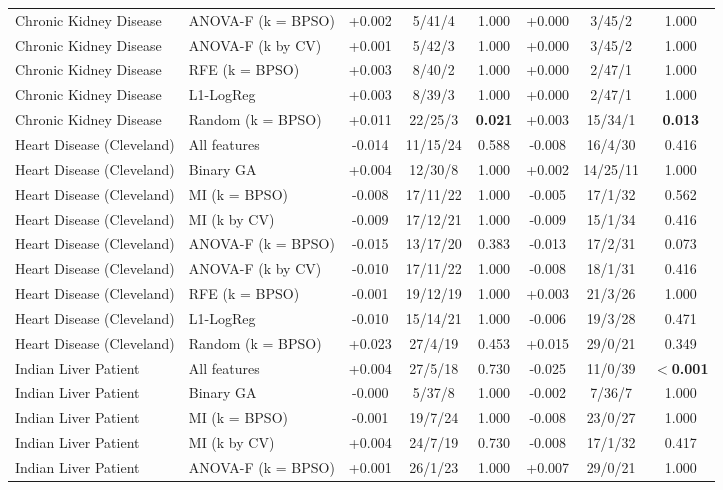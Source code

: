 \begin{table}[!t]
\begin{adjustbox}{max width=\linewidth}
\begin{tabular}{llcccccc}
Chronic Kidney Disease & ANOVA-F (k = BPSO) & +0.002 & 5/41/4 & 1.000 & +0.000 & 3/45/2 & 1.000 \\
Chronic Kidney Disease & ANOVA-F (k by CV) & +0.001 & 5/42/3 & 1.000 & +0.000 & 3/45/2 & 1.000 \\
Chronic Kidney Disease & RFE (k = BPSO) & +0.003 & 8/40/2 & 1.000 & +0.000 & 2/47/1 & 1.000 \\
Chronic Kidney Disease & L1-LogReg & +0.003 & 8/39/3 & 1.000 & +0.000 & 2/47/1 & 1.000 \\
Chronic Kidney Disease & Random (k = BPSO) & +0.011 & 22/25/3 & \textbf{0.021} & +0.003 & 15/34/1 & \textbf{0.013} \\
Heart Disease (Cleveland) & All features & -0.014 & 11/15/24 & 0.588 & -0.008 & 16/4/30 & 0.416 \\
Heart Disease (Cleveland) & Binary GA & +0.004 & 12/30/8 & 1.000 & +0.002 & 14/25/11 & 1.000 \\
Heart Disease (Cleveland) & MI (k = BPSO) & -0.008 & 17/11/22 & 1.000 & -0.005 & 17/1/32 & 0.562 \\
Heart Disease (Cleveland) & MI (k by CV) & -0.009 & 17/12/21 & 1.000 & -0.009 & 15/1/34 & 0.416 \\
Heart Disease (Cleveland) & ANOVA-F (k = BPSO) & -0.015 & 13/17/20 & 0.383 & -0.013 & 17/2/31 & 0.073 \\
Heart Disease (Cleveland) & ANOVA-F (k by CV) & -0.010 & 17/11/22 & 1.000 & -0.008 & 18/1/31 & 0.416 \\
Heart Disease (Cleveland) & RFE (k = BPSO) & -0.001 & 19/12/19 & 1.000 & +0.003 & 21/3/26 & 1.000 \\
Heart Disease (Cleveland) & L1-LogReg & -0.010 & 15/14/21 & 1.000 & -0.006 & 19/3/28 & 0.471 \\
Heart Disease (Cleveland) & Random (k = BPSO) & +0.023 & 27/4/19 & 0.453 & +0.015 & 29/0/21 & 0.349 \\
Indian Liver Patient & All features & +0.004 & 27/5/18 & 0.730 & -0.025 & 11/0/39 & \textbf{$<$0.001} \\
Indian Liver Patient & Binary GA & -0.000 & 5/37/8 & 1.000 & -0.002 & 7/36/7 & 1.000 \\
Indian Liver Patient & MI (k = BPSO) & -0.001 & 19/7/24 & 1.000 & -0.008 & 23/0/27 & 1.000 \\
Indian Liver Patient & MI (k by CV) & +0.004 & 24/7/19 & 0.730 & -0.008 & 17/1/32 & 0.417 \\
Indian Liver Patient & ANOVA-F (k = BPSO) & +0.001 & 26/1/23 & 1.000 & +0.007 & 29/0/21 & 1.000 \\

\end{tabular}
\end{adjustbox}
\end{table}
